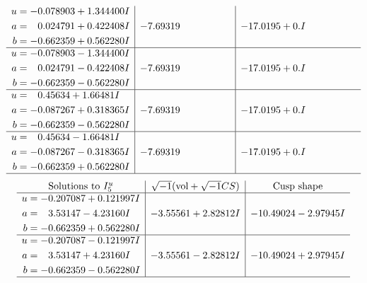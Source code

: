 \documentclass[1p]{elsarticle_modified}
\theoremstyle{definition}
\newcommand{\I}{\sqrt{-1}}
\begin{document}
$$\begin{array}{c|c|c}
\begin{aligned}
u &= -0.078903 + 1.344400 I \\
a &= \phantom{-}0.024791 + 0.422408 I \\
b &= -0.662359 + 0.562280 I\end{aligned}
 & -7.69319\phantom{ +0.000000I} & -17.0195 + 0. I\phantom{ +0.000000I} \\ \hline\begin{aligned}
u &= -0.078903 - 1.344400 I \\
a &= \phantom{-}0.024791 - 0.422408 I \\
b &= -0.662359 - 0.562280 I\end{aligned}
 & -7.69319\phantom{ +0.000000I} & -17.0195 + 0. I\phantom{ +0.000000I} \\ \hline\begin{aligned}
u &= \phantom{-}0.45634 + 1.66481 I \\
a &= -0.087267 + 0.318365 I \\
b &= -0.662359 - 0.562280 I\end{aligned}
 & -7.69319\phantom{ +0.000000I} & -17.0195 + 0. I\phantom{ +0.000000I} \\ \hline\begin{aligned}
u &= \phantom{-}0.45634 - 1.66481 I \\
a &= -0.087267 - 0.318365 I \\
b &= -0.662359 + 0.562280 I\end{aligned}
 & -7.69319\phantom{ +0.000000I} & -17.0195 + 0. I\phantom{ +0.000000I}\\
 \hline 
 \end{array}$$\newpage$$\begin{array}{c|c|c}  
\text{Solutions to }I^u_{5}& \I (\text{vol} + \sqrt{-1}CS) & \text{Cusp shape}\\
 \hline 
\begin{aligned}
u &= -0.207087 + 0.121997 I \\
a &= \phantom{-}3.53147 - 4.23160 I \\
b &= -0.662359 + 0.562280 I\end{aligned}
 & -3.55561 + 2.82812 I & -10.49024 - 2.97945 I \\ \hline\begin{aligned}
u &= -0.207087 - 0.121997 I \\
a &= \phantom{-}3.53147 + 4.23160 I \\
b &= -0.662359 - 0.562280 I\end{aligned}
 & -3.55561 - 2.82812 I & -10.49024 + 2.97945 I\\
 \hline 
 \end{array}$$\newpage\newpage\renewcommand{\arraystretch}{1}
\end{document}
